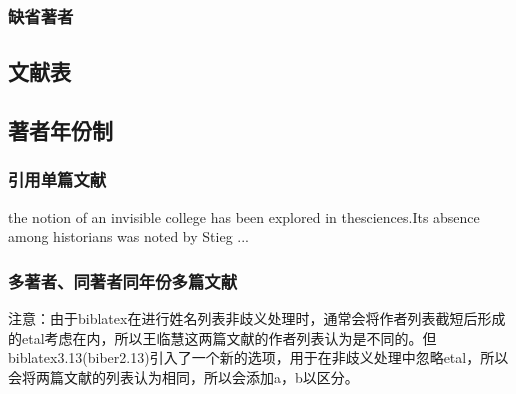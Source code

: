 \documentclass{article}
\begin{document}
\setcounter{section}{8}
\setcounter{subsection}{1}
\setcounter{subsubsection}{2}
\subsubsection{缺省著者}
\begin{refsection}
\nocite{anon1981-628}
\printbibliography[heading=subbibliography]
\end{refsection}

\setcounter{subsection}{1}
\subsection{文献表}
\begin{refsection}

\nocite{尼葛洛庞帝1996--,汪冰1997-16-16,杨宗英1996-24-29,Baker1995--,Chernik1982--,Dowler1995-5-26}

\printbibliography[heading=subbibliography]
\end{refsection}

\setcounter{subsection}{1}
\subsection{著者年份制}
\subsubsection{引用单篇文献}
\begin{refsection}

the notion of an invisible college has been explored in thesciences\cite{CRANE1972--}.Its absence among historians was noted by Stieg ...

\printbibliography[heading=subbibliography]
\end{refsection}



\subsubsection{多著者、同著者同年份多篇文献}
\begin{refsection}

\nocite{王临慧2010-147,王临慧2010-138}
\nocite{KENNEDY1975-311-386,KENNEDY1975-339-360}


\printbibliography[heading=subbibliography]

注意：由于biblatex在进行姓名列表非歧义处理时，通常会将作者列表截短后形成的etal考虑在内，所以王临慧这两篇文献的作者列表认为是不同的。但biblatex3.13(biber2.13)引入了一个新的选项，用于在非歧义处理中忽略etal，所以会将两篇文献的列表认为相同，所以会添加a，b以区分。
\end{refsection}
\end{document}
